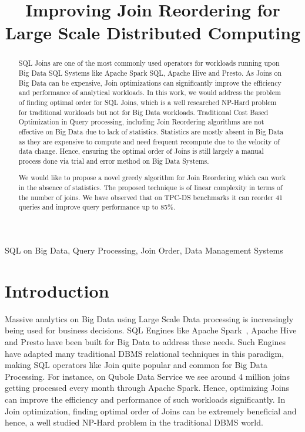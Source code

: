 \documentclass[conference]{IEEEtran}
\begin{document}
\title{Improving Join Reordering for Large Scale Distributed Computing\\
}

\author{
\and
{}
}

\maketitle

\begin{abstract}
SQL Joins are one of the most commonly used operators for workloads running upon Big Data SQL Systems like Apache Spark SQL, Apache Hive and Presto. As Joins on Big Data can be expensive, Join optimizations can significantly improve the efficiency and performance of analytical workloads. In this work, we would address the problem of finding optimal order for SQL Joins, which is a well researched NP-Hard problem for traditional workloads but not for Big Data workloads. Traditional Cost Based Optimization in Query processing, including Join Reordering algorithms are not effective on Big Data due to lack of statistics. Statistics are mostly absent in Big Data as they are expensive to compute and need frequent recompute due to the velocity of data change. Hence, ensuring the optimal order of Joins is still largely a manual process done via trial and error method on Big Data Systems.

We would like to propose a novel greedy algorithm for Join Reordering which can work in the absence of statistics. The proposed technique is of linear complexity in terms of the number of joins. We have observed that on TPC-DS benchmarks it can reorder 41 queries and improve query performance up to 85\%.
\end{abstract}

\begin{IEEEkeywords}
SQL on Big Data, Query Processing, Join Order, Data Management Systems
\end{IEEEkeywords}

\section{Introduction}
Massive analytics on Big Data using Large Scale Data processing is increasingly being used for business decisions. SQL Engines like Apache Spark~\cite{b9}, Apache Hive~\cite{b10} and Presto have been built for Big Data to address these needs. Such Engines have adapted many traditional DBMS relational techniques in this paradigm, making SQL operators like Join quite popular and common for Big Data Processing. For instance, on Qubole Data Service we see around 4 million joins getting processed every month through Apache Spark. Hence, optimizing Joins can improve the efficiency and performance of such workloads significantly. In Join optimization, finding optimal order of Joins can be extremely beneficial and hence, a well studied NP-Hard problem in the traditional DBMS world.
\end{document}
